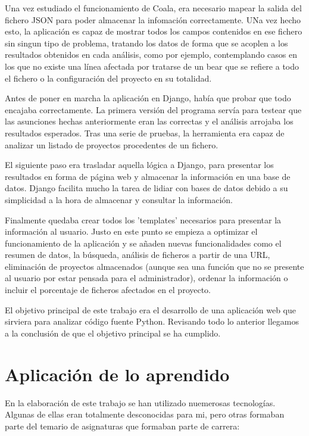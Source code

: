 \documentclass[a4paper, 12pt]{book}
\begin{document}
Una vez estudiado el funcionamiento de Coala, era necesario mapear la salida del fichero JSON para poder almacenar la infomación correctamente. UNa vez hecho esto, la aplicación es capaz de mostrar todos los campos contenidos en ese fichero sin singun tipo de problema, tratando los datos de forma que se acoplen a los resultados obtenidos en cada análisis, como por ejemplo, contemplando casos en los que no existe una línea afectada por tratarse de un bear que se refiere a todo el fichero o la configuración del proyecto en su totalidad.

Antes de poner en marcha la aplicación en Django, había que probar que todo encajaba correctamente. La primera versión del programa servía para testear que las asunciones hechas anteriormente eran las correctas y el análisis arrojaba los resultados esperados. Tras una serie de pruebas, la herramienta era capaz de analizar un listado de proyectos procedentes de un fichero.

El siguiente paso era trasladar aquella lógica a Django, para presentar los resultados en forma de página web y almacenar la información en una base de datos. Django facilita mucho la tarea de lidiar con bases de datos debido a su simplicidad a la hora de almacenar y consultar la información.

Finalmente quedaba crear todos los 'templates' necesarios para presentar la información al usuario. Justo en este punto se empieza a optimizar el funcionamiento de la aplicación y se añaden nuevas funcionalidades como el resumen de datos, la búsqueda, análisis de ficheros a partir de una URL, eliminación de proyectos almacenados (aunque sea una función que no se presente al usuario por estar pensada para el administrador), ordenar la información o incluir el porcentaje de ficheros afectados en el proyecto.

El objetivo principal de este trabajo era el desarrollo de una aplicación web que sirviera para analizar código fuente Python. Revisando todo lo anterior llegamos a la conclusión de que el objetivo principal se ha cumplido.

\section{Aplicación de lo aprendido}
\label{sec:aplicacion}
En la elaboración de este trabajo se han utilizado nuemerosas tecnologías. Algunas de ellas eran totalmente desconocidas para mi, pero otras formaban parte del temario de asignaturas que formaban parte de carrera:
\end{document}
